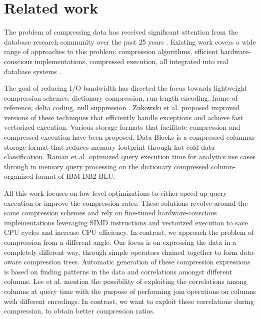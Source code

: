 
\chapter{Related work}
\label{ch:relatedwork}



\ifpdf
    \graphicspath{{7/figures/PNG/}{7/figures/PDF/}{7/figures/}}
\else
    \graphicspath{{7/figures/EPS/}{7/figures/}}
\fi


% 

The problem of compressing data has received significant attention from the database research community over the past 25 years \cite{abadi2006integrating,zukowski2006super,lang2016data,polychroniou2015efficient,graefe1991data}. Existing work covers a wide range of approaches to this problem: compression algorithms, efficient hardware-conscious implementations, compressed execution, all integrated into real database systems \cite{kemper2011hyper,zukowski2012vectorwise}.

The goal of reducing I/O bandwidth has directed the focus towards lightweight compression schemes: dictionary compression, run-length encoding, frame-of-reference, delta coding, null suppression \cite{abadi2006integrating,goldstein1998compressing,lemire2015decoding,roth1993database,zukowski2006super}. Zukowski et al. \cite{zukowski2006super} proposed improved versions of these techniques that efficiently handle exceptions and achieve fast vectorized execution. Various storage formats that facilitate compression and compressed execution have been proposed. Data Blocks \cite{lang2016data} is a compressed columnar storage format that reduces memory footprint through hot-cold data classification. Raman et al. \cite{raman2013db2} optimized query execution time for analytics use cases through in memory query processing on the dictionary compressed column-organized format of IBM DB2 BLU.

All this work focuses on low level optimizations to either speed up query execution or improve the compression rates. These solutions revolve around the same compression schemes and rely on fine-tuned hardware-conscious implementations leveraging SIMD instructions and vectorized execution to save CPU cycles and increase CPU efficiency. In contrast, we approach the problem of compression from a different angle. Our focus is on expressing the data in a completely different way, through simple operators chained together to form data-aware compression trees. Automatic generation of these compression expressions is based on finding patterns in the data and correlations amongst different columns. Lee et al. \cite{lee2014joins} mention the possibility of exploiting the correlations among columns at query time with the purpose of performing join operations on columns with different encodings. In contrast, we want to exploit these correlations during compression, to obtain better compression ratios.

